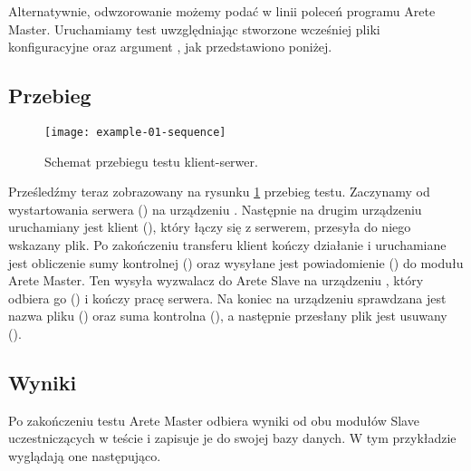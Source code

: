 \documentclass[00-praca-magisterska.tex]{subfiles}
\begin{document}
Alternatywnie, odwzorowanie możemy podać w linii poleceń programu Arete Master.
Uruchamiamy test uwzględniając stworzone wcześniej pliki konfiguracyjne oraz
argument , jak przedstawiono poniżej.


\subsection{Przebieg}

\begin{figure}[htb]
\begin{center}
\leavevmode
\texttt{[image: example-01-sequence]}
\end{center}
\caption{Schemat przebiegu testu klient-serwer.}
\label{fig:example-01-sequence}
\end{figure}

Prześledźmy teraz zobrazowany na rysunku \ref{fig:example-01-sequence} przebieg
testu. Zaczynamy od wystartowania serwera () na urządzeniu .
Następnie na drugim urządzeniu uruchamiany jest klient (), który łączy się z
serwerem, przesyła do niego wskazany plik. Po zakończeniu transferu klient kończy
działanie i uruchamiane jest obliczenie sumy kontrolnej () oraz wysyłane
jest powiadomienie () do modułu Arete Master. Ten wysyła wyzwalacz do
Arete Slave na urządzeniu , który odbiera go () i kończy
pracę serwera. Na koniec na urządzeniu  sprawdzana jest nazwa pliku
() oraz suma kontrolna (), a następnie przesłany plik jest
usuwany ().

\subsection{Wyniki}

Po zakończeniu testu Arete Master odbiera wyniki od obu modułów Slave
uczestniczących w teście i zapisuje je do swojej bazy danych. W tym przykładzie
wyglądają one następująco.
\end{document}
